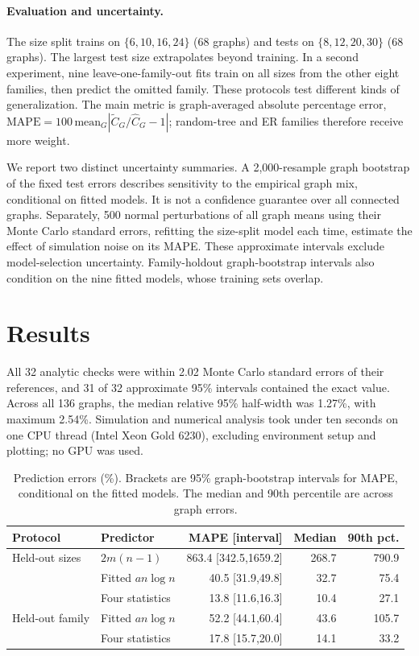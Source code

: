 \documentclass{article}
\begin{document}
\paragraph{Evaluation and uncertainty.}
The size split trains on $\{6,10,16,24\}$ (68 graphs) and tests on $\{8,12,20,30\}$ (68 graphs). The largest test size extrapolates beyond training. In a second experiment, nine leave-one-family-out fits train on all sizes from the other eight families, then predict the omitted family. These protocols test different kinds of generalization. The main metric is graph-averaged absolute percentage error, $\mathrm{MAPE}=100\,\mathrm{mean}_G|\widetilde C_G/\widehat C_G-1|$; random-tree and ER families therefore receive more weight.

We report two distinct uncertainty summaries. A 2,000-resample graph bootstrap of the fixed test errors describes sensitivity to the empirical graph mix, conditional on fitted models. It is not a confidence guarantee over all connected graphs. Separately, 500 normal perturbations of all graph means using their Monte Carlo standard errors, refitting the size-split model each time, estimate the effect of simulation noise on its MAPE. These approximate intervals exclude model-selection uncertainty. Family-holdout graph-bootstrap intervals also condition on the nine fitted models, whose training sets overlap.

\section{Results}
All 32 analytic checks were within 2.02 Monte Carlo standard errors of their references, and 31 of 32 approximate 95\% intervals contained the exact value. Across all 136 graphs, the median relative 95\% half-width was 1.27\%, with maximum 2.54\%. Simulation and numerical analysis took under ten seconds on one CPU thread (Intel Xeon Gold 6230), excluding environment setup and plotting; no GPU was used.

\begin{table}[t]
\centering
\caption{Prediction errors (\%). Brackets are 95\% graph-bootstrap intervals for MAPE, conditional on the fitted models. The median and 90th percentile are across graph errors.}
\label{tab:overall}
\begin{tabular}{llrrr}
\toprule
Protocol & Predictor & MAPE [interval] & Median & 90th pct.\\
\midrule
Held-out sizes & $2m(n-1)$ & 863.4 [342.5,1659.2] & 268.7 & 790.9\\
& Fitted $an\log n$ & 40.5 [31.9,49.8] & 32.7 & 75.4\\
& Four statistics & 13.8 [11.6,16.3] & 10.4 & 27.1\\
Held-out family & Fitted $an\log n$ & 52.2 [44.1,60.4] & 43.6 & 105.7\\
& Four statistics & 17.8 [15.7,20.0] & 14.1 & 33.2\\
\bottomrule
\end{tabular}
\end{table}
\end{document}
